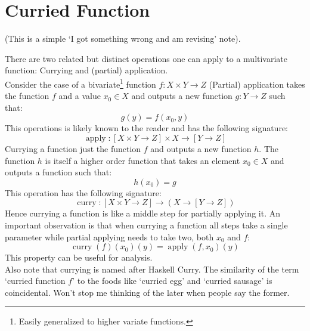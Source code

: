 
\section{Curried Function}
(This is a simple `I got something wrong and am revising' note).

There are two related but distinct operations one can apply to a multivariate function:
Currying and (partial) application.
\\

Consider the case of a bivariate\footnote{Easily generalized to higher variate functions.}
function $f:X\times Y\rightarrow Z$
(Partial) application takes the function $f$ and a value $x_0 \in X$ and outputs a new function $g:Y\rightarrow Z$ such that:
\[g(y) = f(x_0,y)\]
This operations is likely known to the reader and has the following signature:
\[\operatorname{apply}:[X\times Y\rightarrow Z]\times X\rightarrow [Y\rightarrow Z]\]
Currying a function just the function $f$ and outputs a new function $h$.
The function $h$ is itself a higher order function that takes an element $x_0\in X$ and outputs a function such that:
\[h(x_0) = g\]
This operation has the following signature:
\[\operatorname{curry}:[X\times Y\rightarrow Z]\rightarrow(X\rightarrow [Y\rightarrow Z])\]
Hence currying a function is like a middle step for partially applying it.
An important observation is that when currying a function all steps take a single parameter while partial applying needs to take two, both $x_0$ and $f$:
\[\operatorname{curry}(f)(x_0)(y) = \operatorname{apply}(f,x_0)(y)\]
This property can be useful for analysis. 
\\

Also note that currying is named after Haskell Curry.
The similarity of the term `curried function $f$' to the foods like `curried egg' and `curried sausage' is coincidental.
Won't stop me thinking of the later when people say the former.
